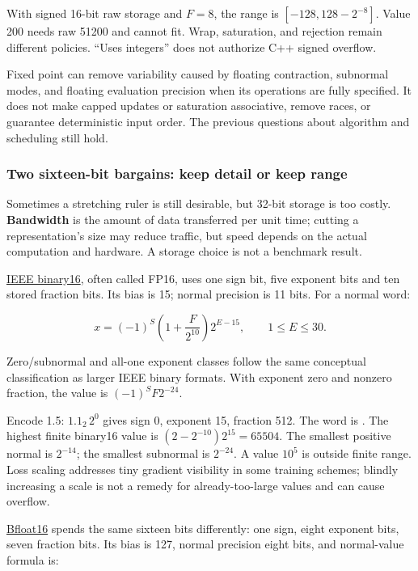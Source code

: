 With signed 16-bit raw storage and \(F=8\), the range is \([-128,128-2^{-8}]\). Value 200 needs raw 51200 and cannot fit. Wrap, saturation, and rejection remain different policies. ``Uses integers'' does not authorize C++ signed overflow.

Fixed point can remove variability caused by floating contraction, subnormal modes, and floating evaluation precision when its operations are fully specified. It does not make capped updates or saturation associative, remove races, or guarantee deterministic input order. The previous questions about algorithm and scheduling still hold.

\subsubsection{Two sixteen-bit bargains: keep detail or keep range}\label{01-foundations-i-ch001-two-sixteen-bit-bargains-keep-detail-or-keep-range}

\hypertarget{01-foundations-i-ch001-two-sixteen-bit-bargains-keep-detail-or-keep-range}{}

Sometimes a stretching ruler is still desirable, but 32-bit storage is too costly. \textbf{Bandwidth} is the amount of data transferred per unit time; cutting a representation's size may reduce traffic, but speed depends on the actual computation and hardware. A storage choice is not a benchmark result.

\hyperref[appendix-34443cec7170]{IEEE binary16}, often called FP16, uses one sign bit, five exponent bits and ten stored fraction bits. Its bias is 15; normal precision is 11 bits. For a normal word:

\[
x=(-1)^S\left(1+\frac{F}{2^{10}}\right)2^{E-15},
\qquad 1\le E\le30.
\]

Zero/subnormal and all-one exponent classes follow the same conceptual classification as larger IEEE binary formats. With exponent zero and nonzero fraction, the value is \((-1)^SF2^{-24}\).

Encode 1.5: \(1.1_2\,2^0\) gives sign 0, exponent 15, fraction 512. The word is . The highest finite binary16 value is \((2-2^{-10})2^{15}=65504\). The smallest positive normal is \(2^{-14}\); the smallest subnormal is \(2^{-24}\). A value \(10^5\) is outside finite range. Loss scaling addresses tiny gradient visibility in some training schemes; blindly increasing a scale is not a remedy for already-too-large values and can cause overflow.

\hyperref[appendix-18b8dd966b5d]{Bfloat16} spends the same sixteen bits differently: one sign, eight exponent bits, seven fraction bits. Its bias is 127, normal precision eight bits, and normal-value formula is:

